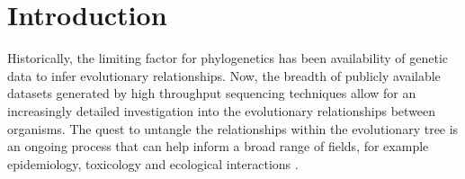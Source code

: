 \documentclass[12pt]{article}
\begin{document}
\section{Introduction}
Historically, %
the limiting factor for phylogenetics has been availability of genetic data to infer evolutionary relationships.
Now, the breadth of publicly available datasets generated by high throughput sequencing techniques allow for an increasingly detailed investigation into the evolutionary relationships between organisms.
The quest to untangle the relationships within the evolutionary tree
 is an ongoing process that can help inform a broad range of fields, for example epidemiology, toxicology and ecological interactions \cite{mctavish2017and}. %
\end{document}

